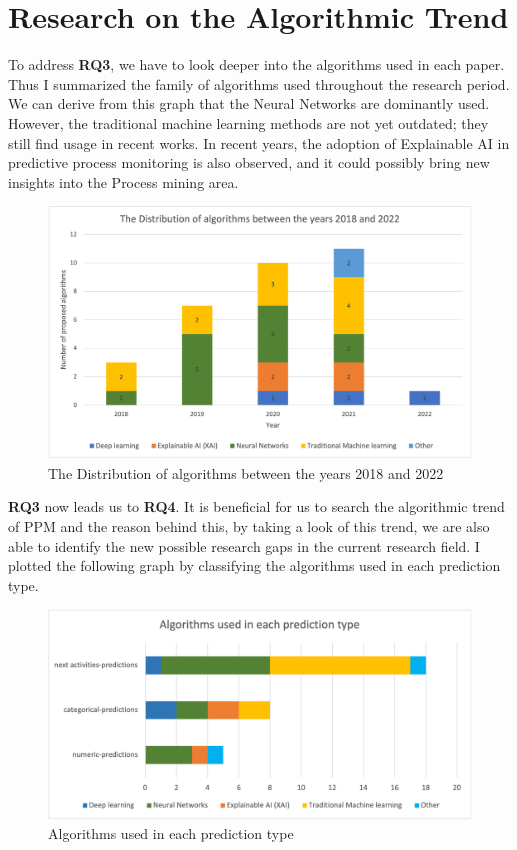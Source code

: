 \documentclass[runningheads]{llncs}
\begin{document}
		
		\section{Research on the Algorithmic Trend}
		
		To address \textbf{RQ3}, we have to look deeper into the algorithms used in each paper. Thus I summarized the family of algorithms used throughout the research period. We can derive from this graph that the Neural Networks are dominantly used. However, the traditional machine learning methods are not yet outdated; they still find usage in recent works. In recent years, the adoption of Explainable AI in predictive process monitoring is also observed, and it could possibly bring new insights into the Process mining area.       
		
		\begin{figure}
		\includegraphics[scale=0.35]{Distribution_algorithms.png}
		\centering
		\caption{The Distribution of algorithms between the years 2018 and 2022}
		\label{algo1}
		\end{figure}
		
		\textbf{RQ3} now leads us to \textbf{RQ4}. It is beneficial for us to search the algorithmic trend of PPM and the reason behind this, by taking a look of this trend, we are also able to identify the new possible research gaps in the current research field. I plotted the following graph by classifying the algorithms used in each prediction type. 
		
		\begin{figure}
		\includegraphics[scale=0.4]{Algorithms_usage.png}
		\centering
		\caption{Algorithms used in each prediction type}
		\label{algo2}
		\end{figure}
		
\end{document}
